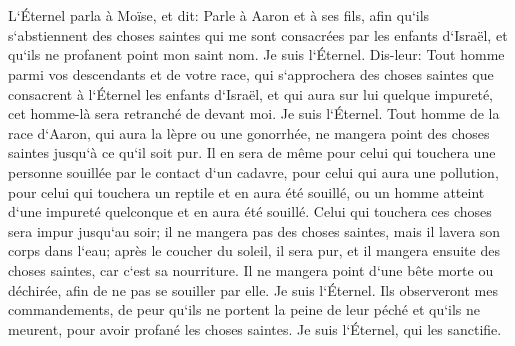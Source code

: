 \chapter{}

\verse L`Éternel parla à Moïse, et dit: 
\verse Parle à Aaron et à ses fils, afin qu`ils s`abstiennent des choses saintes qui me sont consacrées par les enfants d`Israël, et qu`ils ne profanent point mon saint nom. Je suis l`Éternel. 
\verse Dis-leur: Tout homme parmi vos descendants et de votre race, qui s`approchera des choses saintes que consacrent à l`Éternel les enfants d`Israël, et qui aura sur lui quelque impureté, cet homme-là sera retranché de devant moi. Je suis l`Éternel. 
\verse Tout homme de la race d`Aaron, qui aura la lèpre ou une gonorrhée, ne mangera point des choses saintes jusqu`à ce qu`il soit pur. Il en sera de même pour celui qui touchera une personne souillée par le contact d`un cadavre, pour celui qui aura une pollution, 
\verse pour celui qui touchera un reptile et en aura été souillé, ou un homme atteint d`une impureté quelconque et en aura été souillé. 
\verse Celui qui touchera ces choses sera impur jusqu`au soir; il ne mangera pas des choses saintes, mais il lavera son corps dans l`eau; 
\verse après le coucher du soleil, il sera pur, et il mangera ensuite des choses saintes, car c`est sa nourriture. 
\verse Il ne mangera point d`une bête morte ou déchirée, afin de ne pas se souiller par elle. Je suis l`Éternel. 
\verse Ils observeront mes commandements, de peur qu`ils ne portent la peine de leur péché et qu`ils ne meurent, pour avoir profané les choses saintes. Je suis l`Éternel, qui les sanctifie. 
